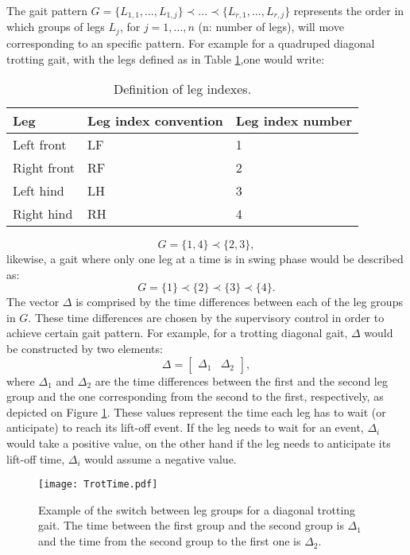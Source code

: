 \documentclass[main.tex]{subfiles}
\begin{document}
The gait pattern $G = \{L_{1,1},...,L_{1,j}\} \prec ... \prec \{L_{r,1},...,L_{r,j}\}$ represents the order in which groups of legs $L_j$, for $j = 1,...,n$ (n: number of legs), will move corresponding to an specific pattern. For example for a quadruped diagonal trotting gait, with the legs defined as in Table \ref{Table:LegIndexes},one would write:
\begin{table}[t]
\centering
\caption{Definition of leg indexes.}
\label{Table:LegIndexes}
\begin{tabular}{|l|l|l|}
\hline
Leg         & Leg index convention & Leg index number \\ \hline
Left front  & LF                   & 1                \\ \hline
Right front & RF                   & 2                \\ \hline
Left hind   & LH                   & 3                \\ \hline
Right hind  & RH                   & 4                \\ \hline
\end{tabular}
\end{table}
\begin{equation}
G = \{1,4\}\prec\{2,3\},
\end{equation}
likewise, a gait where only one leg at a time is in swing phase would be described as:
\begin{equation}
G = \{1\}\prec\{2\}\prec\{3\}\prec\{4\}.
\end{equation}
The vector $\Delta$ is comprised by the time differences between each of the leg groups in $G$. These time differences are chosen by the supervisory control in order to achieve certain gait pattern. For example, for a trotting diagonal gait, $\Delta$ would be constructed by two elements:
\begin{equation}
\Delta = \begin{bmatrix} \Delta_1 & \Delta_2
\end{bmatrix},
\end{equation}
where $\Delta_1$ and $\Delta_2$ are the time differences between the first and the second leg group and the one corresponding from the second to the first, respectively, as depicted on Figure \ref{fig:TrotTime}. These values represent the time each leg has to wait (or anticipate) to reach its lift-off event. If the leg needs to wait for an event, $\Delta_i$ would take a positive value, on the other hand if the leg needs to anticipate its lift-off time, $\Delta_i$ would assume a negative value.
\begin{figure}[t]\centering
		\texttt{[image: TrotTime.pdf]}
		\caption{Example of the switch between leg groups for a diagonal trotting gait. The time between the first group and the second group is $\Delta_1$ and the time from the second group to the first one is $\Delta_2$.
			\label{fig:TrotTime} }
\end{figure}
\end{document}
